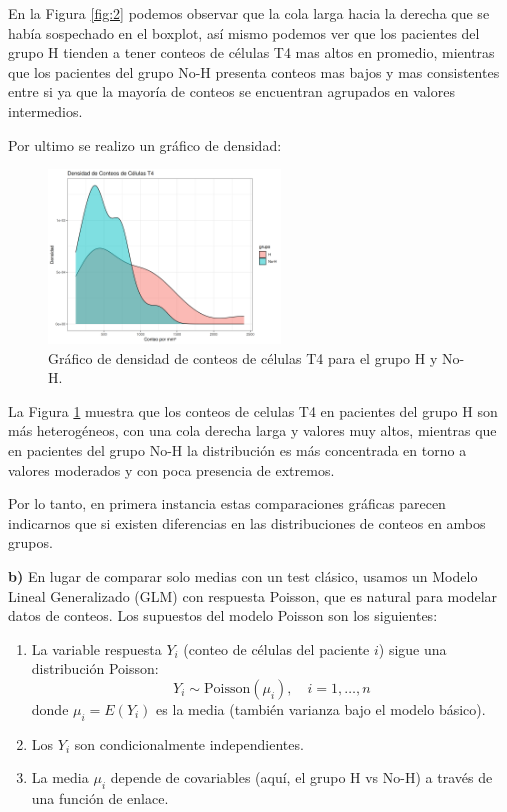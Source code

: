 En la Figura \ref{fig:2} podemos observar que la cola larga hacia la derecha que se había sospechado en el boxplot, así mismo podemos ver que los pacientes del grupo H tienden a tener conteos de células T4 mas altos en promedio, mientras que los pacientes del grupo No-H presenta conteos mas bajos y mas consistentes entre si ya que la mayoría de conteos se encuentran agrupados en valores intermedios.

Por ultimo se realizo un gráfico de densidad: 

\begin{figure}[H]
    \centering
    \includegraphics[width=0.55\textwidth]{images/densidad_comparativa.png}
    \caption{Gráfico de densidad de conteos de células T4 para el grupo H y No-H.}
    \label{fig:3}
\end{figure}

La Figura \ref{fig:3} muestra que los conteos de celulas T4 en pacientes del grupo H son más heterogéneos, con una cola derecha larga y valores muy altos, mientras que en pacientes del grupo No-H la distribución es más concentrada en torno a valores moderados y con poca presencia de extremos.

\begin{tcolorbox}
Por lo tanto, en primera instancia estas comparaciones gráficas parecen indicarnos que si existen diferencias en las distribuciones de conteos en ambos grupos.
\end{tcolorbox}

\textbf{b)} En lugar de comparar solo medias con un test clásico, usamos un Modelo Lineal Generalizado (GLM) con respuesta Poisson, que es natural para modelar datos de conteos. Los supuestos del modelo Poisson son los siguientes:

\begin{enumerate}
    \item La variable respuesta $Y_i$ (conteo de células del paciente $i$) sigue una distribución Poisson:
    \begin{equation*}
        Y_i\sim\text{Poisson}(\mu_i), \quad i=1,\dotso,n 
    \end{equation*}
    donde $\mu_i = E(Y_i)$ es la media (también varianza bajo el modelo básico).
    \item Los $Y_i$ son condicionalmente independientes.
    \item La media $\mu_i$ depende de covariables (aquí, el grupo H vs No-H) a través de una función de enlace.
\end{enumerate}

